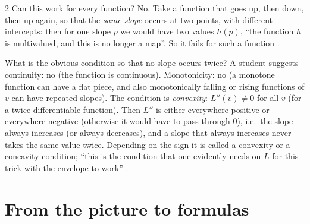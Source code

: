 \begin{paracol}{2}
Can this work for every function? No. Take a function that goes up, then down, then up again, so that the \emph{same slope} occurs at two points, with different intercepts: then for one slope $p$ we would have two values $h(p)$, ``the function $h$ is multivalued, and this is no longer a map''. So it fails for such a function .

\begin{nfigure}
\caption*{A function with two points of equal slope $p$ and different intercepts: $h(p)$ would be two-valued.}
\end{nfigure}
What is the obvious condition so that no slope occurs twice? A student suggests continuity: no (the function is continuous). Monotonicity: no (a monotone function can have a flat piece, and also monotonically falling or rising functions of $v$ can have repeated slopes). The condition is \emph{convexity}: $L''(v)\neq0$ for all $v$ (for a twice differentiable function). Then $L''$ is either everywhere positive or everywhere negative (otherwise it would have to pass through $0$), i.e.\ the slope always increases (or always decreases), and a slope that always increases never takes the same value twice. Depending on the sign it is called a convexity or a concavity condition; ``this is the condition that one evidently needs on $L$ for this trick with the envelope to work'' .

\section{From the picture to formulas}\label{sec:lt-formulas}


\end{paracol}
